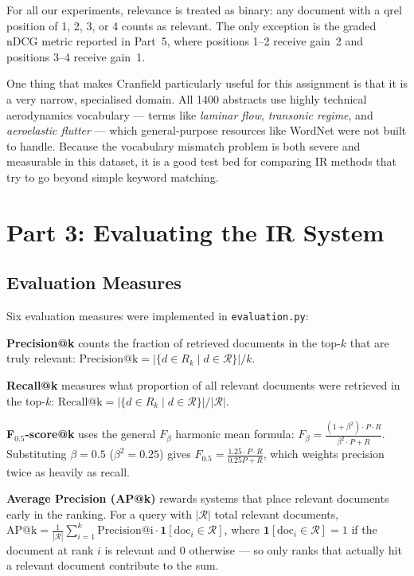 \documentclass{svproc}
\begin{document}
    For all our experiments, relevance is treated as binary: any document with a qrel position of 1, 2, 3, or 4 counts as relevant. The only exception is the graded nDCG metric reported in Part~5, where positions 1--2 receive gain~2 and positions 3--4 receive gain~1.

    One thing that makes Cranfield particularly useful for this assignment is that it is a very narrow, specialised domain. All 1400 abstracts use highly technical aerodynamics vocabulary --- terms like \textit{laminar flow}, \textit{transonic regime}, and \textit{aeroelastic flutter} --- which general-purpose resources like WordNet were not built to handle. Because the vocabulary mismatch problem is both severe and measurable in this dataset, it is a good test bed for comparing IR methods that try to go beyond simple keyword matching.

    \FloatBarrier
    \section{Part 3: Evaluating the IR System}

    \subsection{Evaluation Measures}

    Six evaluation measures were implemented in \texttt{evaluation.py}:

    \textbf{Precision@k} counts the fraction of retrieved documents in the top-$k$ that are truly relevant:
    $\mathrm{Precision@k} = |\{d \in R_k \mid d \in \mathcal{R}\}| / k$.

    \textbf{Recall@k} measures what proportion of all relevant documents were retrieved in the top-$k$:
    $\mathrm{Recall@k} = |\{d \in R_k \mid d \in \mathcal{R}\}| / |\mathcal{R}|$.

    \textbf{F$_{0.5}$-score@k} uses the general $F_\beta$ harmonic mean formula:
    $F_\beta = \frac{(1+\beta^2) \cdot P \cdot R}{\beta^2 \cdot P + R}$.
    Substituting $\beta = 0.5$ ($\beta^2 = 0.25$) gives $F_{0.5} = \frac{1.25 \cdot P \cdot R}{0.25P + R}$, which weights precision twice as heavily as recall.

    \textbf{Average Precision (AP@k)} rewards systems that place relevant documents early in the ranking. For a query with $|\mathcal{R}|$ total relevant documents,
    $\mathrm{AP@k} = \frac{1}{|\mathcal{R}|} \sum_{i=1}^{k} \mathrm{Precision@i} \cdot \mathbf{1}[\mathrm{doc}_i \in \mathcal{R}]$,
    where $\mathbf{1}[\mathrm{doc}_i \in \mathcal{R}] = 1$ if the document at rank $i$ is relevant and 0 otherwise --- so only ranks that actually hit a relevant document contribute to the sum.
\end{document}
